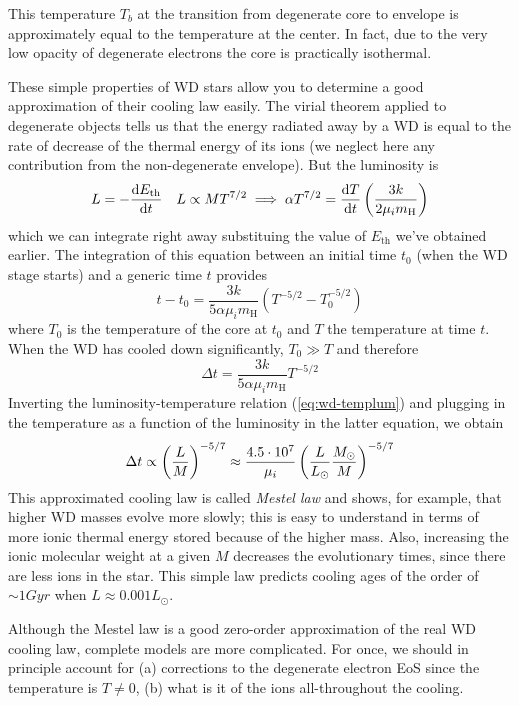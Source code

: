 This temperature $T_{b}$ at the transition from degenerate core to envelope is approximately equal to the temperature at the center. In fact, due to the very low opacity of degenerate electrons the core is practically isothermal.
\par These simple properties of WD stars allow you to determine a good approximation of their cooling law easily. The virial theorem applied to degenerate objects tells us that the energy radiated away by a WD is equal to the rate of decrease of the thermal energy of its ions (we neglect here any contribution from the non-degenerate envelope). But the luminosity is 
\begin{equation*}
    L = -\frac{\text{d}E_{\text{th}}}{\text{d}t} \quad L\propto MT^{7/2} \implies \alpha T^{7/2} = \frac{\text{d}T}{\text{d}t}\left(\frac{3k}{2\mu_{i}m_{\text{H}}}\right)
\end{equation*}
which we can integrate right away substituing the value of $E_{\text{th}}$ we've obtained earlier. The integration of this equation between an initial time $t_{0}$ (when the WD stage starts) and a generic time $t$ provides
\begin{equation}
    t-t_{0} = \frac{3k}{5\alpha \mu_{i}m_{\text{H}}}(T^{-5/2}-T_{0}^{-5/2})
\end{equation}
where $T_{0}$ is the temperature of the core at $t_{0}$ and $T$ the temperature at time $t$. When the WD has cooled down significantly, $T_{0} \gg T$ and therefore
\begin{equation}
    \Delta t = \frac{3k}{5\alpha\mu_{i}m_{\text{H}}}T^{-5/2}
\end{equation}
Inverting the luminosity-temperature relation (\ref{eq:wd-templum}) and plugging in the temperature as a function of the luminosity in the latter equation, we obtain 
\begin{equation}
    \Delta t \propto \left(\frac{L}{M}\right)^{-5/7}\approx \frac{4.5\cdot 10^{7}}{\mu_{i}}\left(\frac{L}{L_{\odot}}\frac{M_{\odot}}{M}\right)^{-5/7}
    \label{eq:mestellaw}
\end{equation}
This approximated cooling law is called \emph{Mestel law} and shows, for example, that higher WD masses evolve more slowly; this is easy to understand in terms of more ionic thermal energy stored because of the higher mass. Also, increasing the ionic molecular weight at a given $M$ decreases the evolutionary times, since there are less ions in the star. This simple law predicts cooling ages of the order of $\sim 1\unit{Gyr}$ when $L \approx 0.001L_{\odot}$.
\par Although the Mestel law is a good zero-order approximation of the real WD cooling law, complete models are more complicated. For once, we should in principle account for (a) corrections to the degenerate electron EoS since the temperature is $T \neq 0$, (b) what is it of the ions all-throughout the cooling.
